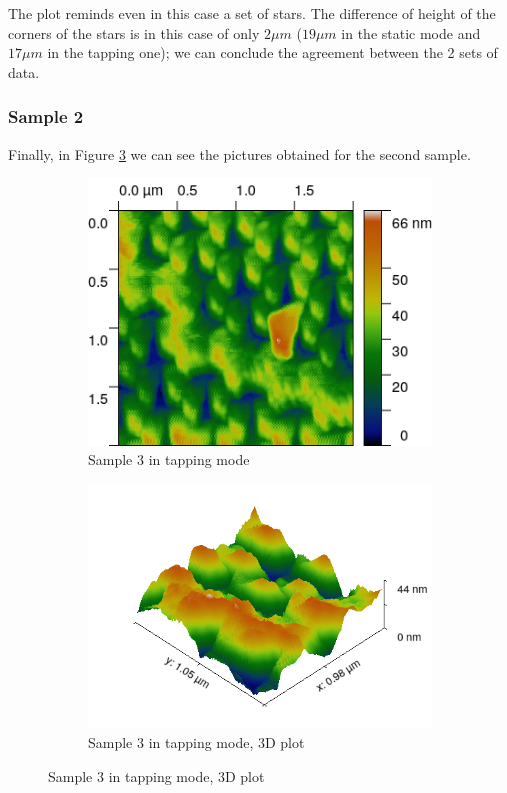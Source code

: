 \documentclass[11pt,a4paper]{article}
\begin{document}
The plot reminds even in this case a set of stars. The difference of height of the corners of the stars is in this case of only $2\mu m$ ($19\mu m$ in the static mode and $17\mu m$ in the tapping one); we can conclude the agreement between the 2 sets of data.

\subsubsection{Sample 2}

Finally, in Figure \ref{fig:tapping_sample3} we can see the pictures obtained for the second sample.

\begin{figure}[H]
\centering
\begin{subfigure}[b]{0.45\textwidth}
\includegraphics[width=\textwidth]{tm_sample3}
\caption{Sample 3 in tapping mode}
\label{fig:}
\end{subfigure}
\begin{subfigure}[b]{0.45\textwidth}
\includegraphics[width=\textwidth]{tm_sample3_3D}
\caption{Sample 3 in tapping mode, 3D plot}
\label{fig:tapping_sample3}
\end{subfigure}
\end{figure}
\end{document}
